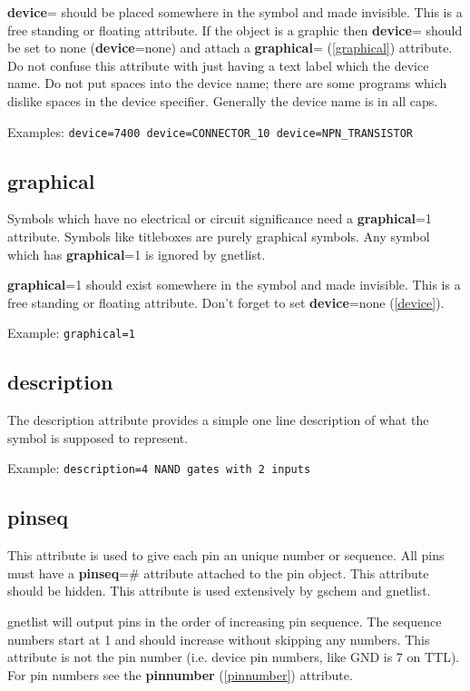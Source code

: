 \documentclass{article}
\begin{document}
{\bf device}= should be placed somewhere in the symbol and made invisible.
This is a free standing or floating attribute.  If the object is a graphic
then {\bf device}= should be set to none ({\bf device}=none) and attach
a {\bf graphical}= (\ref{graphical}) attribute.  Do not confuse this
attribute with just having a text label which the device name.  Do not
put spaces into the device name; there are some programs which dislike
spaces in the device specifier.  Generally the device name is in all caps.

Examples: \texttt{device=7400 device=CONNECTOR\_10 device=NPN\_TRANSISTOR}


\subsection{\bf graphical\label{graphical}}
Symbols which have no electrical or circuit significance need a 
{\bf graphical}=1 attribute.  Symbols like titleboxes are purely
graphical symbols.  Any symbol which has {\bf graphical}=1 is ignored
by gnetlist.

{\bf graphical}=1 should exist somewhere in the symbol and made invisible.
This is a free standing or floating attribute.  Don't forget to set 
{\bf device}=none (\ref{device}).

Example: \texttt{graphical=1}


\subsection{\bf description\label{description}}
The description attribute provides a simple one line description of what 
the symbol is supposed to represent.  

Example: \texttt{description=4 NAND gates with 2 inputs}


\subsection{\bf pinseq\label{pinseq}}
This attribute is used to give each pin an unique number or sequence.
All pins must have a {\bf pinseq}=\# attribute attached to the pin object.
This attribute should be hidden.  This attribute is used extensively by
gschem and gnetlist.

gnetlist will output pins in the order of increasing pin sequence.
The sequence numbers start at 1 and should increase without skipping
any numbers.  This attribute is not the pin number (i.e. device pin
numbers, like GND is 7 on TTL).  For pin numbers see the {\bf pinnumber} (\ref{pinnumber}) attribute.  
\end{document}
